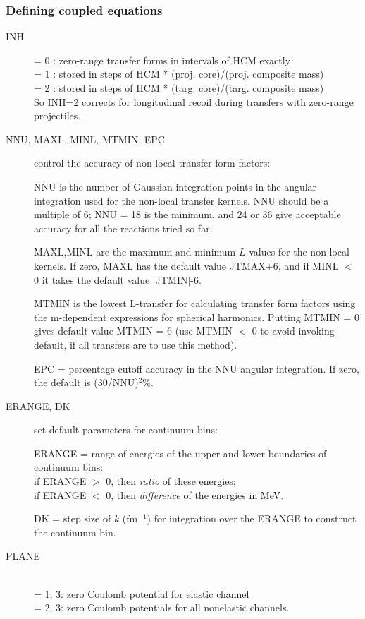 \documentclass[11pt]{article}
\begin{document}
\subsubsection{Defining coupled equations}

\begin{description}

\item[INH]
 = 0 : zero-range transfer forms in intervals of HCM exactly
\\ = 1 : stored in steps of HCM * (proj. core)/(proj. composite mass)
\\ = 2 : stored in steps of HCM * (targ. core)/(targ. composite mass)\\
    So INH=2 corrects for longitudinal recoil during transfers with zero-range projectiles.

\item[NNU, MAXL, MINL, MTMIN, EPC] control the accuracy of non-local transfer form factors:

NNU is the number of Gaussian integration points
in the angular
integration used for the non-local transfer kernels. NNU should
be a multiple of 6; NNU = 18 is the minimum, and 24 or 36 give
acceptable accuracy for all the reactions tried so far.


MAXL,MINL are the maximum and minimum $L$ values
for the non-local
kernels. If zero, MAXL has the default value JTMAX+6, and
if MINL $<$ 0 it takes the default value $|$JTMIN$|$-6.


MTMIN is the lowest L-transfer for calculating transfer form factors
using the m-dependent expressions for spherical harmonics.
Putting MTMIN = 0 gives default value MTMIN = 6 (use MTMIN $<$ 0 to avoid
invoking default, if all transfers are to use this method).

EPC = percentage cutoff accuracy in the NNU angular integration.
If zero, the default is (30/NNU)$^2$\%.

\item[ERANGE, DK] set default parameters for continuum bins:

ERANGE = range of energies of the upper and lower boundaries
of continuum bins:\\
if ERANGE $>$ 0, then {\em ratio} of these energies;\\
if ERANGE $<$ 0, then {\em difference} of the energies in MeV.

DK     = step size of $k$ (fm$^{-1}$) for integration over the ERANGE to construct the continuum bin.

 \item[PLANE] ~\\
      = 1, 3: zero Coulomb potential for elastic channel\\
      = 2, 3: zero Coulomb potentials for all nonelastic channels.
%


\end{description}
\end{document}
